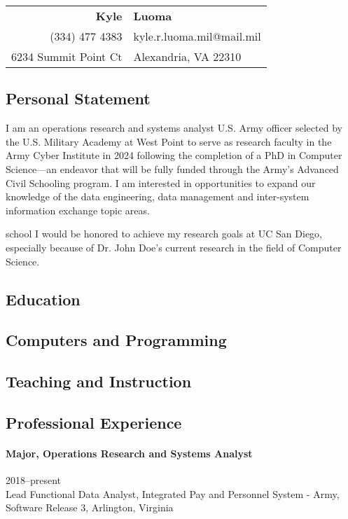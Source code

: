 \documentclass[12pt,letterpaper]{article}
\newcommand{\SchoolName}{UC San Diego}
\newcommand{\ProfessorName}{Dr. John Doe}
\newcommand{\FieldOfStudy}{Computer Science}
\begin{document}
\begin{center}
\begin{tabular}{rl}
\huge\textbf{Kyle} &\huge\textbf{Luoma}\\



(334) 477 4383 &kyle.r.luoma.mil@mail.mil\\
6234 Summit Point Ct &Alexandria, VA 22310\end{tabular}
\end{center}
\CVLine
\subsection{Personal Statement}
I am an operations research and systems analyst U.S. Army officer selected by the U.S. Military Academy at West Point to serve as research faculty in the Army Cyber Institute in 2024 following the completion of a PhD in Computer Science---an endeavor that will be fully funded through the Army's Advanced Civil Schooling program. I am interested in opportunities to expand our knowledge of the data engineering, data management and inter-system information exchange topic areas. \begin{shownto}{school}
I would be honored to achieve my research goals at \SchoolName, especially because of \ProfessorName 's current research in the field of \FieldOfStudy.
\end{shownto}

\subsection{Education}
\EducationSubSectionContents

\subsection{Computers and Programming}
\ComputerSubSectionContents

\subsection{Teaching and Instruction}
\TeachingSubSectionContents

\subsection{Professional Experience} 
\paragraph{Major, Operations Research and Systems Analyst} 2018--present\\
Lead Functional Data Analyst, Integrated Pay and Personnel System - Army, Software Release 3, Arlington, Virginia
\end{document}
